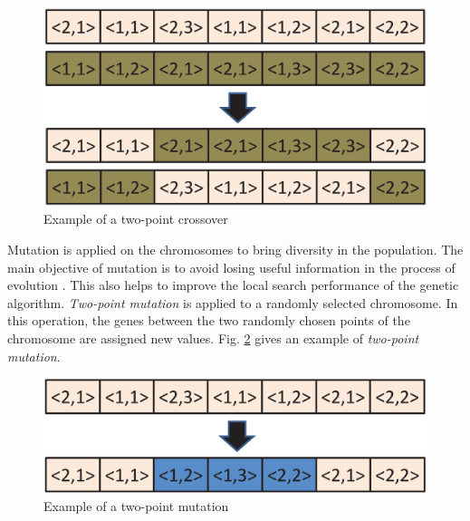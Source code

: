 \documentclass[conference]{IEEEtran}
\begin{document}
\begin{figure}[h]
	\begin{center}
		\includegraphics[scale=0.35]{crossover.eps}
	\end{center}
		\caption{Example of a two-point crossover}
	\label{fig:crossover}
\end{figure}


Mutation %
is applied on the chromosomes to bring diversity in the population. The main objective of mutation
is to avoid losing useful information in the process of evolution \cite{Goldberg}. This also helps to improve the local search performance
of the genetic algorithm. \emph{Two-point mutation} is applied to a randomly selected chromosome. In this operation, the genes between
the two randomly chosen points of the chromosome are assigned new values. Fig. \ref{fig:mutation} gives an example of  \emph{two-point mutation}. %

\begin{figure}[h]
	\begin{center}
		\includegraphics[scale=0.35]{mutation.eps}
	\end{center}
		\caption{Example of a two-point mutation}
	\label{fig:mutation}
\end{figure}
\end{document}
